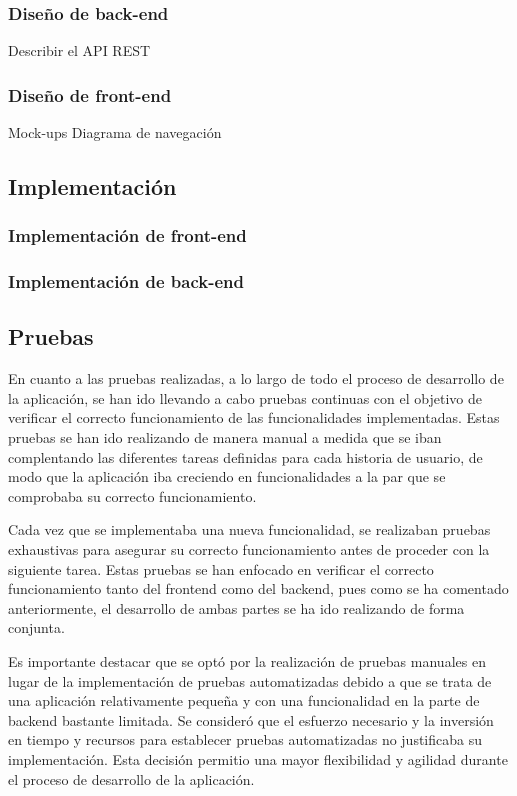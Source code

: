 \documentclass[12pt]{article}
\begin{document}
\subsubsection{Diseño de back-end}
Describir el API REST
\subsubsection{Diseño de front-end}
Mock-ups
Diagrama de navegación

\subsection{Implementación}

\subsubsection{Implementación de front-end}
\subsubsection{Implementación de back-end}

\subsection{Pruebas}
En cuanto a las pruebas realizadas, a lo largo de todo el proceso de desarrollo de la aplicación, se han ido llevando a cabo pruebas continuas
con el objetivo de verificar el correcto funcionamiento de las funcionalidades implementadas. Estas pruebas se han ido realizando de manera manual 
a medida que se iban complentando las diferentes tareas definidas para cada historia de usuario, de modo que la aplicación iba creciendo en funcionalidades 
a la par que se comprobaba su correcto funcionamiento.

Cada vez que se implementaba una nueva funcionalidad, se realizaban pruebas exhaustivas para asegurar su correcto funcionamiento antes de proceder con la 
siguiente tarea. Estas pruebas se han enfocado en verificar el correcto funcionamiento tanto del frontend como del backend, pues como se ha comentado anteriormente, 
el desarrollo de ambas partes se ha ido realizando de forma conjunta.

Es importante destacar que se optó por la realización de pruebas manuales en lugar de la implementación de pruebas automatizadas debido a que se 
trata de una aplicación relativamente pequeña y con una funcionalidad en la parte de backend bastante limitada. Se consideró que el esfuerzo necesario y la inversión
en tiempo y recursos para establecer pruebas automatizadas no justificaba su implementación. Esta decisión permitio una mayor flexibilidad y agilidad durante
el proceso de desarrollo de la aplicación.
\end{document}
